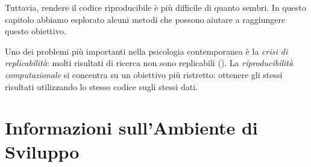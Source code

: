 \documentclass[
  letterpaper,
  DIV=11,
  numbers=noendperiod]{scrreprt}
\theoremstyle{definition}
\theoremstyle{remark}
\begin{document}
Tuttavia, rendere il codice riproducibile è più difficile di quanto
sembri. In questo capitolo abbiamo esplorato alcuni metodi che possono
aiutare a raggiungere questo obiettivo.

\begin{tcolorbox}[enhanced jigsaw, leftrule=.75mm, title=\textcolor{quarto-callout-note-color}{\faInfo}\hspace{0.5em}{Nota}, colframe=quarto-callout-note-color-frame, colbacktitle=quarto-callout-note-color!10!white, arc=.35mm, toptitle=1mm, breakable, rightrule=.15mm, opacityback=0, bottomrule=.15mm, toprule=.15mm, bottomtitle=1mm, coltitle=black, titlerule=0mm, left=2mm, opacitybacktitle=0.6, colback=white]

Uno dei problemi più importanti nella psicologia contemporanea è la
\emph{crisi di replicabilità}: molti risultati di ricerca non sono
replicabili (). La
\emph{riproducibilità computazionale} si concentra su un obiettivo più
ristretto: ottenere gli stessi risultati utilizzando lo stesso codice
sugli stessi dati.

\end{tcolorbox}

\section{Informazioni sull'Ambiente di
Sviluppo}\label{informazioni-sullambiente-di-sviluppo}
\end{document}
